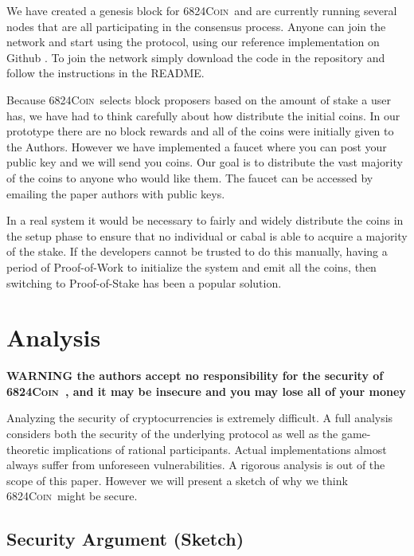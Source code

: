 \documentclass{article}
\newcommand{\coin}{ \textsc{6824Coin}\ }
\begin{document}
We have created a genesis block for \coin and are currently running several nodes that are all participating in the consensus process. Anyone can join the network and start using the protocol, using our reference implementation on Github \cite{6824coincode}. To join the network simply download the code in the repository and follow the instructions in the README.

Because \coin selects block proposers based on the amount of stake a user has, we have had to think carefully about how distribute the initial coins. In our prototype there are no block rewards and all of the coins were initially given to the Authors. However we have implemented a faucet where you can post your public key and we will send you coins. Our goal is to distribute the vast majority of the coins to anyone who would like them. The faucet can be accessed by emailing the paper authors with public keys.

In a real system it would be necessary to fairly and widely distribute the coins in the setup phase to ensure that no individual or cabal is able to acquire a majority of the stake. If the developers cannot be trusted to do this manually, having a period of Proof-of-Work to initialize the system and emit all the coins, then switching to Proof-of-Stake has been a popular solution.

\section{Analysis}
\large{ \color{red}  { \textbf{ WARNING the authors accept no responsibility for the security of \coin, and it may be insecure and you may lose all of your money } } } 

Analyzing the security of cryptocurrencies is extremely difficult. A full analysis considers both the security of the underlying protocol as well as the game-theoretic implications of rational participants. Actual implementations almost always suffer from unforeseen vulnerabilities. A rigorous analysis is out of the scope of this paper. However we will present a sketch of why we think \coin might be secure.

\subsection{Security Argument (Sketch)}\label{security}
\end{document}
